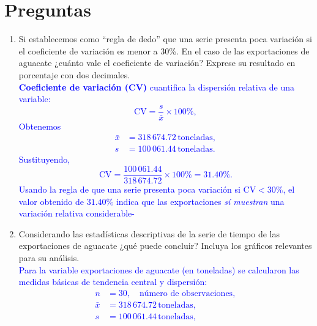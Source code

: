 \documentclass[10pt]{article}
\begin{document}
\section{Preguntas}
\begin{enumerate}
    \item Si establecemos como “regla de dedo” que una serie presenta poca variación si el coeficiente de variación es menor a 30\%. En el caso de las exportaciones de aguacate ¿cuánto vale el coeficiente de variación? Exprese su resultado en porcentaje con dos decimales.\\
      \textcolor{blue}{
        \noindent\textbf{Coeficiente de variación (CV)} cuantifica la dispersión relativa de una variable:
        \begin{equation}
          \mathrm{CV} = \frac{s}{\bar{x}}\times 100\%,
        \end{equation}
        \noindent Obtenemos
        \begin{align}
          \bar{x} &= 318\,674.72 \,\text{toneladas},\\
          s &= 100\,061.44 \,\text{toneladas}.
        \end{align}
        Sustituyendo,
        \begin{equation}
            \mathrm{CV} = \frac{100\,061.44}{318\,674.72}\times 100\% = \mathbf{31.40\%}.
        \end{equation}
        \noindent Usando la regla de que una serie presenta poca variación si $\mathrm{CV}<30\%$, el valor obtenido de $31.40\%$ indica que las exportaciones \emph{sí muestran} una variación relativa considerable-
      }
    \item Considerando las estadísticas descriptivas de la serie de tiempo de las exportaciones de aguacate ¿qué puede concluir? Incluya los gráficos relevantes para su análisis.\\
    \textcolor{blue}{
      \noindent Para la variable exportaciones de aguacate (en toneladas) se calcularon las medidas básicas de tendencia central y dispersión:
      \begin{align}
        n &= 30, \quad \text{número de observaciones},\\
        \bar{x} &= 318\,674.72 \,\text{toneladas},\\
        s &= 100\,061.44 \,\text{toneladas},\\

\end{align}}
\end{enumerate}
\end{document}
